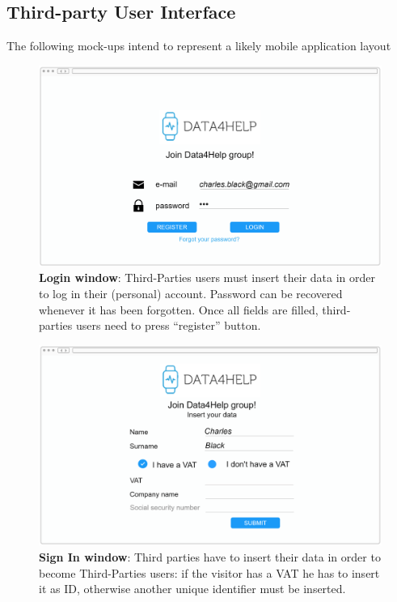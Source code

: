 \subsection{Third-party User Interface}
The following mock-ups intend to represent a likely mobile application layout 

\begin{figure}[H]
\centering
\includegraphics[scale = 0.5]{Mocks/Desktop_Login.PNG}
\caption{\textbf{Login window}: Third-Parties users must insert their data in order to log in their (personal) account. Password can be recovered whenever it has been forgotten. Once all fields are filled, third-parties users need to press “register” button.}
\end{figure}

\begin{figure}[H]
\centering
\includegraphics[scale = 0.5]{Mocks/Desktop_Sign_In.PNG}
\caption{\textbf{Sign In window}: Third parties have to insert their data in order to become Third-Parties users: if the visitor has a VAT he has to insert it as ID, otherwise another unique identifier must be inserted.}
\end{figure}

